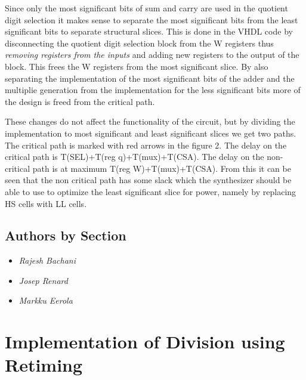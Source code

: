 \documentclass[11pt,a4paper]{article}
\begin{document}
\FloatBarrier

Since only the most significant bits of sum and carry are used in the quotient digit selection it makes sense to separate the most significant bits from the least significant bits to separate structural slices. This is done in the VHDL code by disconnecting the quotient digit selection block from the W registers thus \textit{removing registers from the inputs} and adding new registers to the output of the block. This frees the W registers from the most significant slice. By also separating the implementation of the most significant bits of the adder and the multiplie generation from the implementation for the less significant bits more of the design is freed from the critical path.

These changes do not affect the functionality of the circuit, but by dividing the implementation to most significant and least significant slices we get two paths. The critical path is marked with red arrows in the figure 2. The delay on the critical path is T(SEL)+T(reg q)+T(mux)+T(CSA). The delay on the non-critical path is at maximum T(reg W)+T(mux)+T(CSA). From this it can be seen that the non critical path has some slack which the synthesizer should be able to use to optimize the least significant slice for power, namely by replacing HS cells with LL cells.


\subsection{Authors by Section}
\begin{itemize}
\item \textit{Rajesh Bachani} 
\item \textit{Josep Renard} 
\item \textit{Markku Eerola} 
\end{itemize}

\section{Implementation of Division using Retiming}
\label{section:impl}
\end{document}
